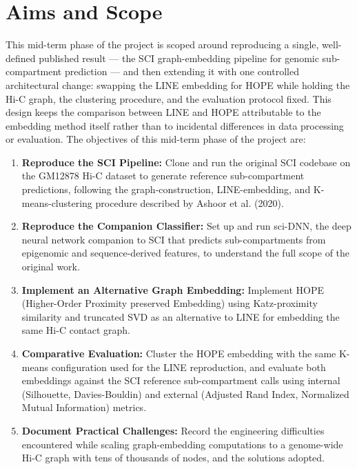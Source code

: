 \documentclass[12pt]{article}
\begin{document}
\section{Aims and Scope}

This mid-term phase of the project is scoped around reproducing a single, well-defined
published result — the SCI graph-embedding pipeline for genomic sub-compartment prediction —
and then extending it with one controlled architectural change: swapping the LINE embedding
for HOPE while holding the Hi-C graph, the clustering procedure, and the evaluation protocol
fixed. This design keeps the comparison between LINE and HOPE attributable to the embedding
method itself rather than to incidental differences in data processing or evaluation. The
objectives of this mid-term phase of the project are:

\begin{enumerate}
    \item \textbf{Reproduce the SCI Pipeline:} Clone and run the original SCI codebase on the
    GM12878 Hi-C dataset to generate reference sub-compartment predictions, following the
    graph-construction, LINE-embedding, and K-means-clustering procedure described by
    Ashoor et al. (2020).

    \item \textbf{Reproduce the Companion Classifier:} Set up and run sci-DNN, the deep neural
    network companion to SCI that predicts sub-compartments from epigenomic and
    sequence-derived features, to understand the full scope of the original work.

    \item \textbf{Implement an Alternative Graph Embedding:} Implement HOPE (Higher-Order
    Proximity preserved Embedding) using Katz-proximity similarity and truncated SVD as an
    alternative to LINE for embedding the same Hi-C contact graph.

    \item \textbf{Comparative Evaluation:} Cluster the HOPE embedding with the same K-means
    configuration used for the LINE reproduction, and evaluate both embeddings against the SCI
    reference sub-compartment calls using internal (Silhouette, Davies-Bouldin) and external
    (Adjusted Rand Index, Normalized Mutual Information) metrics.

    \item \textbf{Document Practical Challenges:} Record the engineering difficulties encountered
    while scaling graph-embedding computations to a genome-wide Hi-C graph with tens of
    thousands of nodes, and the solutions adopted.
\end{enumerate}
\end{document}
